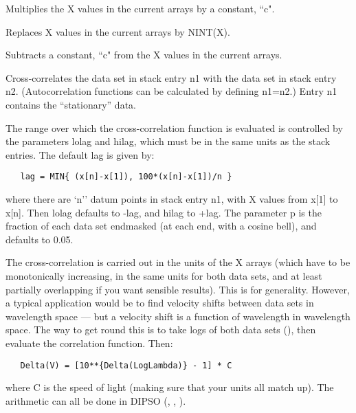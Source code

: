 \begin {description}
Multiplies the X values in the current arrays by a constant, ``c".

Replaces X values in the current arrays by NINT(X).

Subtracts a constant, ``c" from the X values in the current arrays.

Cross-correlates the data set in stack entry n1 with the data set in
stack entry n2. (Autocorrelation functions can be calculated by
defining n1=n2.) Entry n1 contains the ``stationary'' data.

The range over which the cross-correlation function is evaluated is
controlled by the parameters lolag and hilag, which must be in the
same units as the stack entries. The default lag is given by:

\begin{verbatim}
   lag = MIN{ (x[n]-x[1]), 100*(x[n]-x[1])/n }
\end{verbatim}

where there are `n'' datum points in stack entry n1, with X values from
x[1] to x[n]. Then lolag defaults to -lag, and hilag to +lag. The
parameter p is the fraction of each data set endmasked (at each end,
with a cosine bell), and defaults to 0.05.

The cross-correlation is carried out in the units of the X arrays
(which have to be monotonically increasing, in the same units for both
data sets, and at least partially overlapping if you want sensible
results). This is for generality. However, a typical application would
be to find velocity shifts between data sets in wavelength space ---
but a velocity shift is a function of wavelength in wavelength space.
The way to get round this is to take logs of both data sets 
(),
then evaluate the correlation function. Then:

\begin{verbatim}
   Delta(V) = [10**{Delta(LogLambda)} - 1] * C
\end{verbatim}

where C is the speed of light (making sure that your units all match
up). The arithmetic can all be done in DIPSO
(, ,  ). 


\end{description}

